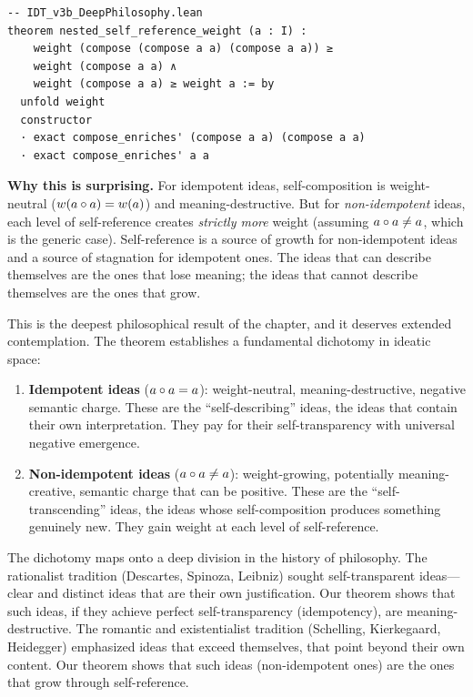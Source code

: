 \begin{lstlisting}
-- IDT_v3b_DeepPhilosophy.lean
theorem nested_self_reference_weight (a : I) :
    weight (compose (compose a a) (compose a a)) ≥
    weight (compose a a) ∧
    weight (compose a a) ≥ weight a := by
  unfold weight
  constructor
  · exact compose_enriches' (compose a a) (compose a a)
  · exact compose_enriches' a a
\end{lstlisting}

\begin{surprisebox}
\textbf{Why this is surprising.} For idempotent ideas, self-composition
is weight-neutral ($w(a \circ a) = w(a)$) and meaning-destructive.
But for \emph{non-idempotent} ideas, each level of self-reference
creates \emph{strictly more} weight (assuming $a \circ a \neq a$,
which is the generic case). Self-reference is a source of growth for
non-idempotent ideas and a source of stagnation for idempotent ones.
The ideas that can describe themselves are the ones that lose meaning;
the ideas that cannot describe themselves are the ones that grow.
\end{surprisebox}

This is the deepest philosophical result of the chapter, and it deserves
extended contemplation. The theorem establishes a fundamental dichotomy in
ideatic space:

\begin{enumerate}
\item \textbf{Idempotent ideas} ($a \circ a = a$): weight-neutral,
meaning-destructive, negative semantic charge. These are the
``self-describing'' ideas, the ideas that contain their own
interpretation. They pay for their self-transparency with universal
negative emergence.
\item \textbf{Non-idempotent ideas} ($a \circ a \neq a$):
weight-growing, potentially meaning-creative, semantic charge that can
be positive. These are the ``self-transcending'' ideas, the ideas whose
self-composition produces something genuinely new. They gain weight at
each level of self-reference.
\end{enumerate}

The dichotomy maps onto a deep division in the history of philosophy.
The rationalist tradition (Descartes, Spinoza, Leibniz) sought
self-transparent ideas---clear and distinct ideas that are their own
justification. Our theorem shows that such ideas, if they achieve
perfect self-transparency (idempotency), are meaning-destructive. The
romantic and existentialist tradition (Schelling, Kierkegaard, Heidegger)
emphasized ideas that exceed themselves, that point beyond their own
content. Our theorem shows that such ideas (non-idempotent ones) are
the ones that grow through self-reference.

